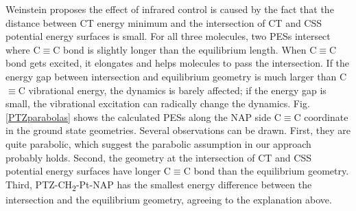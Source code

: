Weinstein proposes the effect of infrared control is caused by the fact that the distance between CT energy minimum and the intersection of CT and CSS potential energy surfaces is small. For all three molecules, two PESs intersect where C$\equiv$C bond is slightly longer than the equilibrium length. When C$\equiv$C bond gets excited, it elongates and helps molecules to pass the intersection. If the energy gap between intersection and equilibrium geometry is much larger than C$\equiv$C vibrational energy, the dynamics is barely affected; if the energy gap is small, the vibrational excitation can radically change the dynamics.
Fig. \ref{PTZparabolas} shows the calculated PESs along the NAP side C$\equiv$C coordinate in the ground state geometries. Several observations can be drawn. First, they are quite parabolic, which suggest the parabolic assumption in our approach probably holds. Second, the geometry at the intersection of CT and CSS potential energy surfaces have  longer C$\equiv$C bond than the equilibrium geometry. Third, PTZ-CH\textsubscript{2}-Pt-NAP has the smallest energy difference between the intersection and the equilibrium geometry, agreeing to the explanation above.

